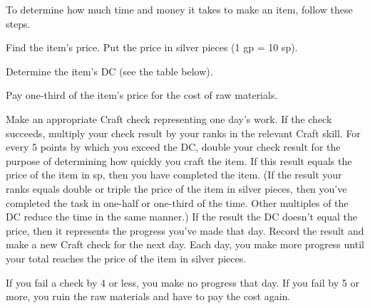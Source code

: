 \begin{comment}
To determine the time required to craft an item, consult the table below.
\begin{dtable*}
  \lcaption{Crafting Time}
  \begin{tabularx}{\columnwidth}{l X}
    \thead{Item Price} & \thead{Crafting Time} \\
    1gp or less & 1 hour per sp (minimum 1 hour) \\
    10gp or less & 1 day per 2 gp (minimum 1 day) \\
    100gp or less & 5 days \add 1 day \add 4 gp \\
    1000gp or less & 30 days \add 1 day per 100  gp \\
  \end{tabularx}
\end{dtable*}
\end{comment}

To determine how much time and money it takes to make an item, follow these steps.
\begin{enumerate*}
\item Find the item's price. Put the price in silver pieces (1 gp = 10 sp).
\item Determine the item's DC (see the table below).
\item Pay one-third of the item's price for the cost of raw materials.
\item Make an appropriate Craft check representing one day's work. If the check succeeds, multiply your check result by your ranks in the relevant Craft skill. For every 5 points by which you exceed the DC, double your check result for the purpose of determining how quickly you craft the item. If this result equals the price of the item in sp, then you have completed the item. (If the result \mtimes your ranks equals double or triple the price of the item in silver pieces, then you've completed the task in one-half or one-third of the time. Other multiples of the DC reduce the time in the same manner.) If the result \mtimes the DC doesn't equal the price, then it represents the progress you've made that day. Record the result and make a new Craft check for the next day. Each day, you make more progress until your total reaches the price of the item in silver pieces.
\end{enumerate*}

If you fail a check by 4 or less, you make no progress that day. If you fail by 5 or more, you ruin the raw materials and have to pay the cost again.


